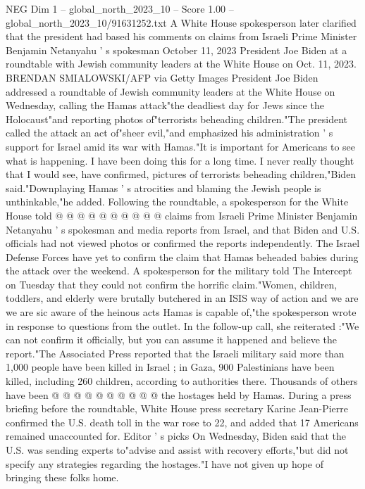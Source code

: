 \begin{textsample}{NEG Dim 1 – global\_north\_2023\_10 – Score 1.00 – global\_north\_2023\_10/91631252.txt}  \label{ex:f1_neg_309}
A White House spokesperson later clarified that the president had based his comments on claims from Israeli Prime Minister Benjamin Netanyahu ' s spokesman October 11, 2023 President Joe Biden at a roundtable with Jewish community leaders at the White House on Oct. 11, 2023.
BRENDAN SMIALOWSKI/AFP via Getty Images President Joe Biden addressed a roundtable of Jewish community leaders at the White House on Wednesday, calling the Hamas attack"the deadliest day for Jews since the Holocaust"and reporting photos of"terrorists beheading children."The president called the attack an act of"sheer evil,"and emphasized his administration ' s support for Israel amid its war with Hamas."It is important for Americans to see what is happening.
I have been doing this for a long time.
I never really thought that I would see, have confirmed, pictures of terrorists beheading children,"Biden said."Downplaying Hamas ' s atrocities and blaming the Jewish people is unthinkable,"he added.
Following the roundtable, a spokesperson for the White House told @ @ @ @ @ @ @ @ @ @ claims from Israeli Prime Minister Benjamin Netanyahu ' s spokesman and media reports from Israel, and that Biden and U.S. officials had not viewed photos or confirmed the reports independently.
The Israel Defense Forces have yet to confirm the claim that Hamas beheaded babies during the attack over the weekend.
A spokesperson for the military told The Intercept on Tuesday that they could not confirm the horrific claim."Women, children, toddlers, and elderly were brutally butchered in an ISIS way of action and we are we are sic aware of the heinous acts Hamas is capable of,"the spokesperson wrote in response to questions from the outlet.
In the follow-up call, she reiterated :"We can not confirm it officially, but you can assume it happened and believe the report."The Associated Press reported that the Israeli military said more than 1,000 people have been killed in Israel ; in Gaza, 900 Palestinians have been killed, including 260 children, according to authorities there.
Thousands of others have been @ @ @ @ @ @ @ @ @ @ the hostages held by Hamas.
During a press briefing before the roundtable, White House press secretary Karine Jean-Pierre confirmed the U.S. death toll in the war rose to 22, and added that 17 Americans remained unaccounted for.
Editor ' s picks On Wednesday, Biden said that the U.S. was sending experts to"advise and assist with recovery efforts,"but did not specify any strategies regarding the hostages."I have not given up hope of bringing these folks home.

\end{textsample}
